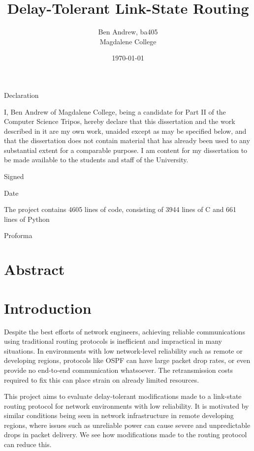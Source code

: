 \documentclass[10pt,twoside,a4paper]{article}
\title{Delay-Tolerant Link-State Routing}
\author{Ben Andrew, ba405\\Magdalene College}
\date{\today}
\begin{document}
\maketitle


Declaration

I, Ben Andrew of Magdalene College, being a candidate for Part II of the Computer Science
Tripos, hereby declare that this dissertation and the work described in it are my own work,
unaided except as may be specified below, and that the dissertation does not contain
material that has already been used to any substantial extent for a comparable purpose.
I am content for my dissertation to be made available to the students and staff of the
University.

Signed

Date

The project contains 4605 lines of code, consisting of 3944 lines of C and 661 lines of Python

Proforma

\tableofcontents


\section{Abstract}



\section{Introduction}


Despite the best efforts of network engineers, achieving reliable communications using traditional routing protocols is inefficient and impractical in many situations. In environments with low network-level reliability such as remote or developing regions, protocols like OSPF can have large packet drop rates, or even provide no end-to-end communication whatsoever. The retransmission costs required to fix this can place strain on already limited resources.

This project aims to evaluate delay-tolerant modifications made to a link-state routing protocol for network environments with low reliability. It is motivated by similar conditions being seen in network infrastructure in remote developing regions, where issues such as unreliable power can cause severe and unpredictable drops in packet delivery. We see how modifications made to the routing protocol can reduce this.
\end{document}
